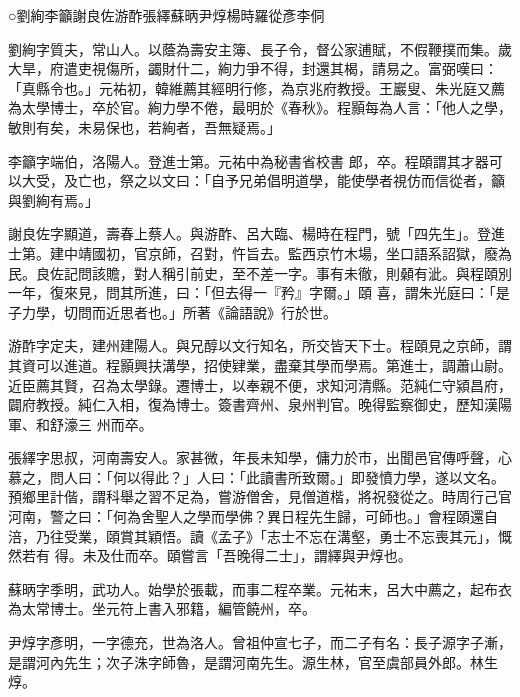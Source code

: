 
\begin{pinyinscope}

 ○劉絢李籲謝良佐游酢張繹蘇昞尹焞楊時羅從彥李侗



 劉絢字質夫，常山人。以蔭為壽安主簿、長子令，督公家逋賦，不假鞭撲而集。歲大旱，府遣吏視傷所，蠲財什二，絢力爭不得，封還其楬，請易之。富弼嘆曰：「真縣令也。」元祐初，韓維薦其經明行修，為京兆府教授。王巖叟、朱光庭又薦為太學博士，卒於官。絢力學不倦，最明於《春秋》。程顥每為人言：「他人之學，敏則有矣，未易保也，若絢者，吾無疑焉。」



 李籲字端伯，洛陽人。登進士第。元祐中為秘書省校書
 郎，卒。程頤謂其才器可以大受，及亡也，祭之以文曰：「自予兄弟倡明道學，能使學者視仿而信從者，籲與劉絢有焉。」



 謝良佐字顯道，壽春上蔡人。與游酢、呂大臨、楊時在程門，號「四先生」。登進士第。建中靖國初，官京師，召對，忤旨去。監西京竹木場，坐口語系詔獄，廢為民。良佐記問該贍，對人稱引前史，至不差一字。事有未徹，則顙有泚。與程頤別一年，復來見，問其所進，曰：「但去得一『矜』字爾。」頤
 喜，謂朱光庭曰：「是子力學，切問而近思者也。」所著《論語說》行於世。



 游酢字定夫，建州建陽人。與兄醇以文行知名，所交皆天下士。程頤見之京師，謂其資可以進道。程顥興扶溝學，招使肄業，盡棄其學而學焉。第進士，調蕭山尉。近臣薦其賢，召為太學錄。遷博士，以奉親不便，求知河清縣。范純仁守潁昌府，闢府教授。純仁入相，復為博士。簽書齊州、泉州判官。晚得監察御史，歷知漢陽軍、和舒濠三
 州而卒。



 張繹字思叔，河南壽安人。家甚微，年長未知學，傭力於市，出聞邑官傳呼聲，心慕之，問人曰：「何以得此？」人曰：「此讀書所致爾。」即發憤力學，遂以文名。預鄉里計偕，謂科舉之習不足為，嘗游僧舍，見僧道楷，將祝發從之。時周行己官河南，警之曰：「何為舍聖人之學而學佛？異日程先生歸，可師也。」會程頤還自涪，乃往受業，頤賞其穎悟。讀《孟子》「志士不忘在溝壑，勇士不忘喪其元」，慨然若有
 得。未及仕而卒。頤嘗言「吾晚得二士」，謂繹與尹焞也。



 蘇昞字季明，武功人。始學於張載，而事二程卒業。元祐末，呂大中薦之，起布衣為太常博士。坐元符上書入邪籍，編管饒州，卒。



 尹焞字彥明，一字德充，世為洛人。曾祖仲宣七子，而二子有名：長子源字子漸，是謂河內先生；次子洙字師魯，是謂河南先生。源生林，官至虞部員外郎。林生焞。




\end{pinyinscope}
